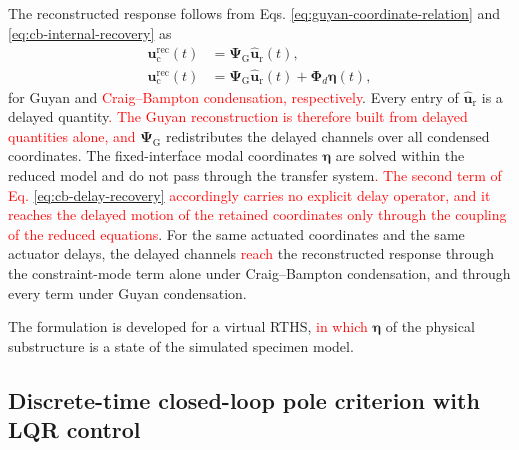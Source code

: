 \documentclass[11pt,a4paper]{article}
\numberwithin{equation}{section}
\newcommand{\rev}[1]{\textcolor{red}{#1}}
\begin{document}
The reconstructed response follows from Eqs. \eqref{eq:guyan-coordinate-relation} and \eqref{eq:cb-internal-recovery} as
\begin{subequations}
	\label{eq:delay-recovery}
	\begin{align}
		\bm{u}_{\mathrm{c}}^{\mathrm{rec}}(t)&=\bm{\Psi}_{\mathrm{G}}\hat{\bm{u}}_{\mathrm{r}}(t),
		\label{eq:guyan-delay-recovery}\\
		\bm{u}_{\mathrm{c}}^{\mathrm{rec}}(t)&=\bm{\Psi}_{\mathrm{G}}\hat{\bm{u}}_{\mathrm{r}}(t)
		+\bm{\Phi}_{d}\bm{\eta}(t),
		\label{eq:cb-delay-recovery}
	\end{align}
\end{subequations}
for Guyan and \rev{Craig--Bampton condensation, respectively}. Every entry of \(\hat{\bm{u}}_{\mathrm{r}}\) is a delayed quantity\rev{. The Guyan reconstruction is therefore built from delayed quantities alone, and} \(\bm{\Psi}_{\mathrm{G}}\) redistributes the delayed channels over all condensed coordinates. The fixed-interface modal coordinates \(\bm{\eta}\) are solved within the reduced model and do not pass through the transfer system\rev{. The second term of Eq. \eqref{eq:cb-delay-recovery} accordingly carries no explicit delay operator, and it reaches the delayed motion of the retained coordinates only through the coupling of the reduced equations}. For the same actuated coordinates and the same actuator delays, the delayed channels \rev{reach} the reconstructed response through the constraint-mode term alone under Craig--Bampton condensation, and through every term under Guyan condensation.

The formulation is developed for a virtual RTHS, \rev{in which} \(\bm{\eta}\) of the physical substructure is a state of the simulated specimen model.

\subsection{Discrete-time closed-loop pole criterion with LQR control}
\label{sec:pole-criterion}
\end{document}
